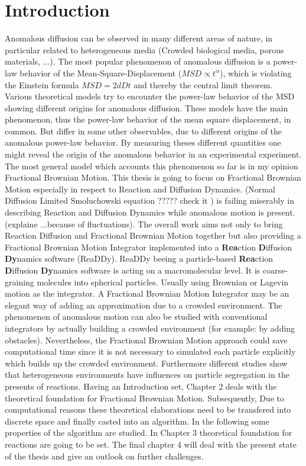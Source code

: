\documentclass[
  a4paper,BCOR10mm,oneside,
  bibtotoc,idxtotoc,
  headsepline,footsepline,%
  fleqn,openbib
]{scrbook}
\begin{document}
\chapter{Introduction}
Anomalous diffusion can be observed in many different areas of nature, in particular related to heterogeneous media (Crowded biological media, porous materials, ...). The most popular phenomenon of anomalous diffusion is a power-law behavior of the Mean-Square-Displacement ($MSD\propto t^{\alpha}$), which is violating the Einstein formula $MSD=2 d D t$ and thereby the central limit theorem. Various theoretical models try to encounter the power-law behavior of the MSD showing different origins for anomalous diffusion. These models have the main phenomenon, thus the power-law behavior of the mean square displacement, in common. But differ in some other observables, due to different origins of the anomalous power-law behavior. By measuring theses different quantities one might reveal the origin of the anomalous behavior in an experimental experiment.\newline
The most general model which accounts this phenomenon so far is in my opinion Fractional Brownian Motion. This thesis is going to focus on Fractional Brownian Motion especially in respect to Reaction and Diffusion Dynamics. (Normal Diffusion Limited Smoluchowski equation ????? check it ) is failing miserably in describing Reaction and Diffusion Dynamics while anomalous motion is present.(explaine ...because of fluctuations). The overall work aims not only to bring Reaction Diffusion and Fractional Brownian Motion together but also providing a Fractional Brownian Motion Integrator implemented into a \textbf{Rea}ction \textbf{D}iffusion \textbf{Dy}namics software (ReaDDy). ReaDDy beeing a particle-based \textbf{Rea}ction \textbf{D}iffusion \textbf{Dy}namics software is acting on a macromolecular level. It is coarse-graining molecules into spherical particles. Usually using Brownian or Lagevin motion as the integrator. A Fractional Brownian Motion Integrator may be an elegant way of adding an approximation due to a crowded environment. The phenomenon of anomalous motion can also be studied with conventional integrators by actually building a crowded environment (for example: by adding obstacles). Nevertheless, the Fractional Brownian Motion approach could save computational time since it is not necessary to simulated each particle  explicitly which builds up the crowded environment. Furthermore different studies show that heterogeneous environments have influences on particle segregation in the presents of reactions.\newline
Having an Introduction set, Chapter 2 deals with the theoretical foundation for Fractional Brownian Motion. Subsequently, Due to computational reasons these theoretical elaborations need to be transfered into discrete space and finally casted into an algorithm. In the following some properties of the algorithm are studied.
In Chapter 3 theoretical foundation for reactions are going to be set. The final chapter 4 will deal with the present state of the thesis and give an outlook on further challenges.  
\end{document}

